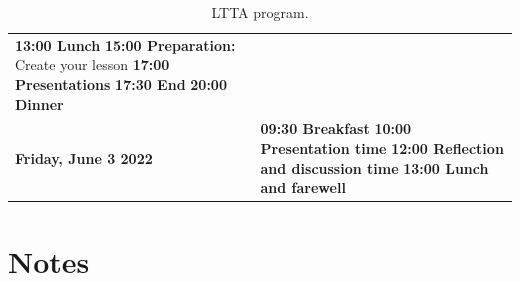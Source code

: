 \documentclass[11pt]{article}
\begin{document}
\begin{table}
\begin{center}
\begin{tabular}{m{6cm} m{8cm}}
        \newline \textbf{13:00 Lunch} \newline
        \textbf{15:00 Preparation:} Create your lesson
        \newline
        \textbf{17:00 Presentations} \newline
        \textbf{17:30 End} \newline
        \textbf{20:00 Dinner} \\
        \rowcolor{gray!15}
        \centering\textbf{Friday, June 3 2022} &
        \textbf{09:30 Breakfast} \newline 
        \textbf{10:00 Presentation time} \newline 
        \textbf{12:00 Reflection and discussion time} \newline 
        \textbf{13:00 Lunch and farewell} \\
        \bottomrule%
    \end{tabular}
      \caption[LTTA program]{LTTA program.}
      \label{tab:program}
     \end{center}
    \end{table}

    \newpage



\newpage
\section*{Notes}
\end{document}
